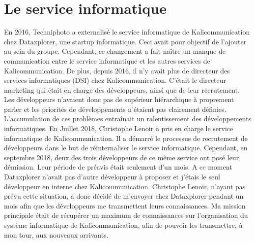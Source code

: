 \section{Le service informatique}
En 2016, Techniphoto a externalisé le service informatique de Kalicommunication chez Dataxplorer, une startup informatique. Ceci avait pour objectif de l'ajouter au sein du groupe. Cependant, ce changement a fait naître un manque de communication entre le service informatique et les autres services de Kalicommunication.\newline
De plus, depuis 2016, il n'y avait plus de directeur des services informatiques (DSI) chez Kalicommunication. C'était le directeur marketing qui était en charge des développeurs, ainsi que de leur recrutement. Les développeurs n'avaient donc pas de supérieur hiérarchique à proprement parler et les priorités de développements n'étaient pas clairement définies. L'accumulation de ces problèmes entraînait un ralentissement des développements informatiques.\newline
En Juillet 2018, Christophe Lenoir a pris en charge le service informatique de Kalicommunication. Il a démarré le processus de recrutement de développeurs dans le but de réinternaliser le service informatique.\newline
Cependant, en septembre 2018, deux des trois développeurs de ce même service ont posé leur démission. Leur période de préavis était seulement d'un mois. A ce moment Dataxplorer n'avait pas d'autre développeur à proposer et j'étais le seul développeur en interne chez Kalicommunication. Christophe Lenoir, n'ayant pas prévu cette situation, a donc décidé de m'envoyer chez Dataxplorer pendant un mois afin que les développeurs me transmettent leurs connaissances.\newline
Ma mission principale était de récupérer un maximum de connaissances sur l'organisation du système informatique de Kalicommunication, afin de pouvoir les transmettre, à mon tour, aux nouveaux arrivants.